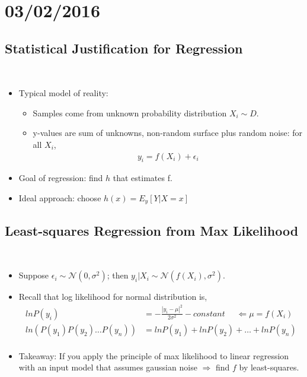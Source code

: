 \documentclass[10pt]{article}
\begin{document}
\newpage
\section*{03/02/2016}
	\subsection*{Statistical Justification for Regression}
	\
	\begin{itemize}
		\item Typical model of reality:
			\begin{itemize}
				\item Samples come from unknown probability distribution $X_{i} \sim D$.
				\item y-values are sum of unknowns, non-random surface plus random noise: for all $X_{i}$,
					\begin{align*}
						y_{i} = f(X_{i}) + \epsilon_{i}
					\end{align*}
			\end{itemize}
		\item Goal of regression: find $h$ that estimates f.
		\item Ideal approach: choose $h(x) = E_{y}[Y | X=x]$
	\end{itemize} 
	
	\subsection*{Least-squares Regression from Max Likelihood}
	\
	\begin{itemize}
		\item Suppose $\epsilon_{i} \sim \mathcal{N}(0, \sigma^{2})$; then $y_{i}|X_{i} \sim \mathcal{N}(f(X_{i}), \sigma^{2})$.
		\item Recall that log likelihood for normal distribution is,
			\begin{align*}
				ln P(y_{i}) &= - \frac{|y_{i} - \mu|^{2}}{2\sigma^{2}} - constant \ \ \ \ \ \ \Leftarrow \mu = f(X_{i})\\
				ln(P(y_{1})P(y_{2}) \dots P(y_{n})) &= ln P(y_{1}) + ln P(y_{2}) + \dots + ln P(y_{n})\\
			\end{align*}
		\item Takeaway: If you apply the principle of max likelihood to linear regression with an input model that assumes gaussian noise $\Rightarrow$ find $f$ by least-squares. 
	\end{itemize}
	
\end{document}
